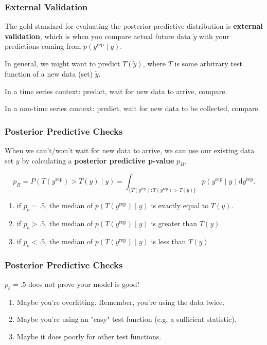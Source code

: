\documentclass{beamer}
\begin{document}
\begin{frame}
\frametitle{External Validation}

The gold standard for evaluating the posterior predictive distribution is {\bf external validation}, which is when you compare actual future data $\tilde{y}$ with your predictions coming from $p(y^{\text{rep}} \mid y)$.
\newline

In general, we might want to predict $T(\tilde{y})$, where $T$ is some arbitrary test function of a new data (set) $\tilde{y}$.
\newline

In a time series context: predict, wait for new data to arrive, compare.
\newline

In a non-time series context: predict, wait for new data to be collected, compare.

\end{frame}

\begin{frame}
\frametitle{Posterior Predictive Checks}

When we can't/won't wait for new data to arrive, we can use our existing data set $y$ by calculating a {\bf posterior predictive p-value} $p_B$. 
\newline

\[
p_B = P(T(y^{\text{rep}}) > T(y) \mid y) = \int_{\{T(y^{\text{rep}}) : T(y^{\text{rep}}) > T(y) \}} p(y^{\text{rep}} \mid y) \text{d}y^{\text{rep}}. 
\]

\begin{enumerate}
\item if $p_b = .5$, the median of $p(T(y^{\text{rep}}) \mid y)$ is exactly equal to $T(y)$.
\item if $p_b > .5$, the median of $p(T(y^{\text{rep}}) \mid y)$ is greater than  $T(y)$.
\item if $p_b < .5$, the median of $p(T(y^{\text{rep}}) \mid y)$ is less than  $T(y)$
\end{enumerate}



\end{frame}




\begin{frame}
\frametitle{Posterior Predictive Checks}

$p_b = .5$ does not \*prove\* your model is good! 
\begin{enumerate}
\item Maybe you're overfitting. Remember, you're using the data twice.
\item Maybe you're using an "easy" test function (e.g. a sufficient statistic).
\item Maybe it does poorly for other test functions.
\end{enumerate}

\end{frame}
\end{document}
